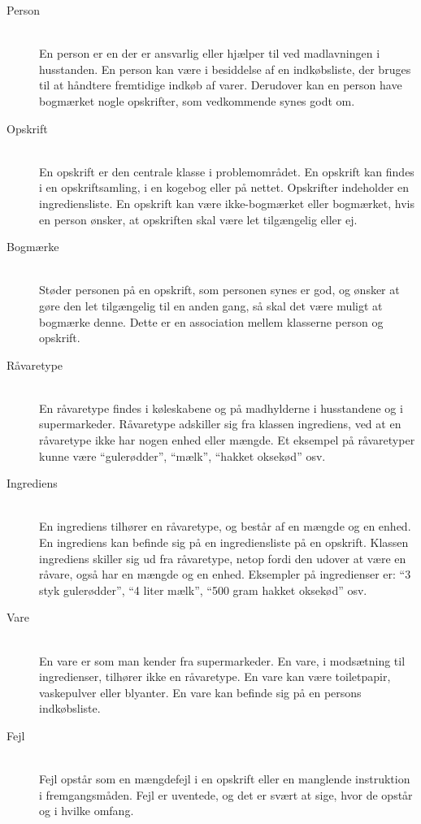 \begin{description}
\item[Person] \hfill \\
En person er en der er ansvarlig eller hjælper til ved madlavningen i husstanden. En person kan være i besiddelse af en indkøbsliste, der bruges til at håndtere fremtidige indkøb af varer. Derudover kan en person have bogmærket nogle opskrifter, som vedkommende synes godt om.

\item[Opskrift] \hfill \\
En opskrift er den centrale klasse i problemområdet. En opskrift kan findes i en opskriftsamling, i en kogebog eller på nettet. Opskrifter indeholder en ingrediensliste. En opskrift kan være ikke-bogmærket eller bogmærket, hvis en person ønsker, at opskriften skal være let tilgængelig eller ej.

\item[Bogmærke] \hfill \\
Støder personen på en opskrift, som personen synes er god, og ønsker at gøre den let tilgængelig til en anden gang, så skal det være muligt at bogmærke denne. Dette er en association mellem klasserne person og opskrift.

\item[Råvaretype] \hfill \\
En råvaretype findes i køleskabene og på madhylderne i husstandene og i supermarkeder. Råvaretype adskiller sig fra klassen ingrediens, ved at en råvaretype ikke har nogen enhed eller mængde. Et eksempel på råvaretyper kunne være ``gulerødder'', ``mælk'', ``hakket oksekød'' osv. 

\item[Ingrediens] \hfill \\ 
En ingrediens tilhører en råvaretype, og består af en mængde og en enhed. En ingrediens kan befinde sig på en ingrediensliste på en opskrift. Klassen ingrediens skiller sig ud fra råvaretype, netop fordi den udover at være en råvare, også har en mængde og en enhed. Eksempler på ingredienser er: ``3 styk gulerødder'', ``4 liter mælk'', ``500 gram hakket oksekød'' osv.

\item[Vare] \hfill \\
En vare er som man kender fra supermarkeder. En vare, i modsætning til ingredienser, tilhører ikke en råvaretype. En vare kan \fx være toiletpapir, vaskepulver eller blyanter. En vare kan befinde sig på en persons indkøbsliste.

\item[Fejl] \hfill \\
Fejl opstår som \fx en mængdefejl i en opskrift eller en manglende instruktion i fremgangsmåden. Fejl er uventede, og det er svært at sige, hvor de opstår og i hvilke omfang.

\end{description}

